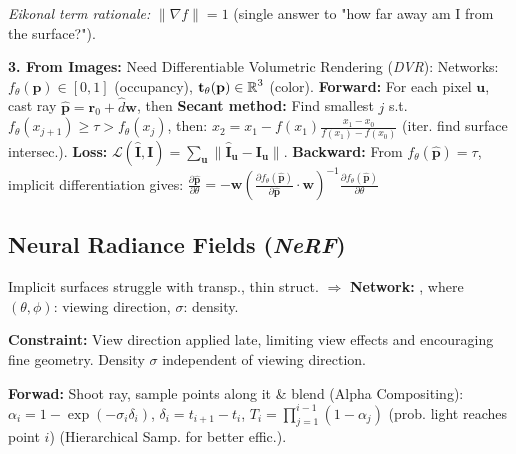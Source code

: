 \textit{Eikonal term rationale:} $\|\nabla f\| = 1$ (single answer to "how far away am I from the surface?").


\textbf{3. From Images:} Need Differentiable Volumetric Rendering (\emph{DVR}): Networks: {\footnotesize$f_\theta(\mathbf{p}) \in [0,1]$} (occupancy), {\footnotesize$\mathbf{t}_\theta(\mathbf{p}) \in \operatorname{\mathbb{R}}^3$} (color). \textbf{Forward:} For each pixel {\footnotesize$\mathbf{u}$}, cast ray {\footnotesize$\hat{\mathbf{p}} = \mathbf{r}_0 + \hat{d}\mathbf{w}$}, then \textbf{Secant method:} Find smallest $j$ s.t. {\footnotesize$f_\theta(x_{j+1}) \geq \tau > f_\theta(x_j)$}, then: {\footnotesize$x_2 = x_1 - f(x_1) \frac{x_1 - x_0}{f(x_1) - f(x_0)}$} (iter. find surface  intersec.). \textbf{Loss:} {\footnotesize$\mathcal{L}(\hat{\mathbf{I}}, \mathbf{I}) = \sum_\mathbf{u} \|\hat{\mathbf{I}}_\mathbf{u} - \mathbf{I}_\mathbf{u}\|$}. \textbf{Backward:} From {\footnotesize$f_\theta(\hat{\mathbf{p}}) = \tau$}, implicit differentiation gives: {\footnotesize$\frac{\partial \hat{\mathbf{p}}}{\partial \theta} = -\mathbf{w} \left(\frac{\partial f_\theta(\hat{\mathbf{p}})}{\partial \hat{\mathbf{p}}} \cdot \mathbf{w}\right)^{-1} \frac{\partial f_\theta(\hat{\mathbf{p}})}{\partial \theta}$}

\subsection{Neural Radiance Fields (\emph{NeRF})}
Implicit surfaces struggle with transp., thin struct. $\Rightarrow$ \textbf{Network:} , where $(\theta, \phi)$: viewing direction, $\sigma$: density.

\textbf{Constraint:} View direction applied late, limiting view effects and encouraging fine geometry. Density $\sigma$ independent of viewing direction.

\textbf{Forwad:} Shoot ray, sample points along it \& blend (Alpha Compositing):
{\footnotesize$\alpha_i = 1 - \exp(-\sigma_i \delta_i)$, $\delta_i = t_{i+1} - t_i$, 
$T_i = \prod_{j=1}^{i-1}(1 - \alpha_j)$ (prob. light reaches point $i$)
} (Hierarchical Samp. for better effic.).

